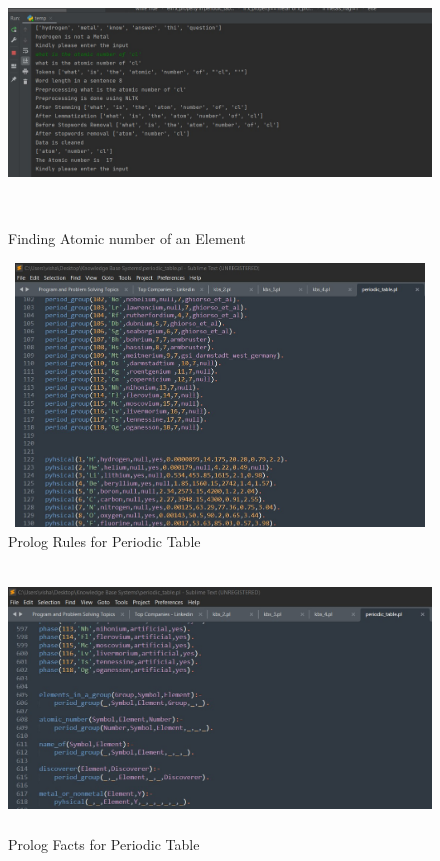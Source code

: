 \documentclass{article}
\begin{document}
\begin{figure}[htp]
    \centering
    \includegraphics[width=15cm, height = 7cm]{Images/sc-6.jpg}
    \caption{Finding Atomic number of an Element}
    \label{fig: Example 6}
\end{figure}

\begin{figure}[htp]
    \centering
    \includegraphics[width=15cm, height = 7cm]{Images/sc-10.jpg}
    \caption{Prolog Rules for Periodic Table}
    \label{fig: Example 7}
\end{figure}

\begin{figure}[htp]
    \centering
    \includegraphics[width=15cm, height = 7cm]{Images/sc-7.jpg}
    \caption{Prolog Facts for Periodic Table}
    \label{fig: Example 8}
\end{figure}
\end{document}
